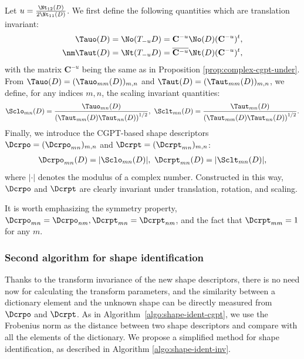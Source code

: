 Let $u=\frac{\Nt_{12}(D)}{2\Nt_{11}(D)}$. We first define  the
following quantities which are translation invariant:
\begin{align}
  \label{eq:shape_descrp_trans}
  \Tauo(D) &= \No(T_{-u}D) = \mathbf{C}^{-u}\No(D)(\mathbf{C}^{-u})^t, \\
  \nm
  \Taut(D) &= \Nt(T_{-u}D) = \overline{\mathbf{C}^{-u}}\Nt(D)(\mathbf{C}^{-u})^t,
\end{align}
with the matrix $\mathbf{C}^{-u}$ being the same as in Proposition
\ref{prop:complex-cgpt-under}. From $\Tauo(D)
=(\Tauo_{mm}(D))_{m,n}$ and $\Taut(D) =(\Taut_{mm}(D))_{m,n}$, we
define, for any indices $m,n$, the scaling invariant quantities:
\begin{align}
  \label{eq:shape_descrp_scl}
  \Sclo_{mn}(D) =
  \frac{\Tauo_{mn}(D)}{\left(\Taut_{mm}(D)\Taut_{nn}(D)\right)^{1/2}}, \
  \Sclt_{mn}(D) =
  \frac{\Taut_{mn}(D)}{\left(\Taut_{mm}(D)\Taut_{nn}(D)\right)^{1/2}}
  .
\end{align}
Finally, we introduce the CGPT-based shape descriptors $\Dcrpo = (
\Dcrpo_{mn})_{m,n}$ and $\Dcrpt =  (\Dcrpt_{mn})_{m,n}$:
\begin{align}
  \label{eq:shape_descrp}
  \Dcrpo_{mn}(D) = |\Sclo_{mn}(D)|, \ \Dcrpt_{mn}(D) =
  |\Sclt_{mn}(D)|,
\end{align}
where $|\cdot|$ denotes the modulus of a complex number.
Constructed in this way, $\Dcrpo$ and $\Dcrpt$ are clearly
invariant under translation, rotation, and scaling.

It is worth emphasizing the symmetry property, $\Dcrpo_{mn} =
\Dcrpo_{nm}, \Dcrpt_{mn} = \Dcrpt_{nm}$, and the fact that
$\Dcrpt_{mm} =1$ for any $m$.

\subsubsection{Second algorithm for shape identification}\label{sec:second-algor-shape}
Thanks to the transform invariance of the new shape descriptors,
there is no need now for calculating the transform parameters, and
the similarity between a dictionary element and the unknown shape
can be directly measured from $\Dcrpo$ and $\Dcrpt$. As in
Algorithm~\ref{algo:shape-ident-cgpt}, we use the Frobenius norm
as the distance between two shape descriptors and compare with all
the elements of the dictionary. We propose a simplified method for
shape identification, as described in Algorithm
\ref{algo:shape-ident-inv}.

